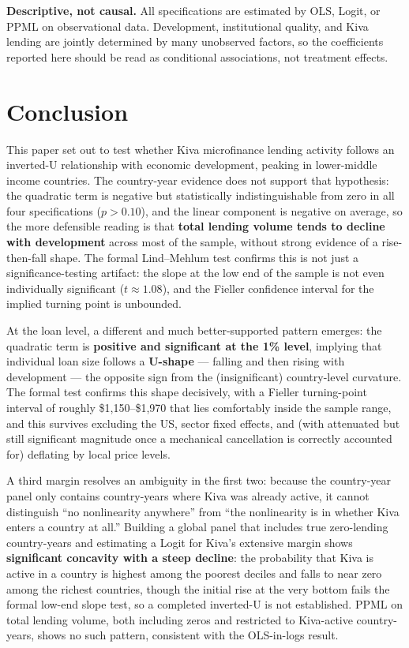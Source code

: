 \documentclass[12pt]{article}
\begin{document}
\textbf{Descriptive, not causal.} All specifications are estimated by OLS, Logit, or PPML on
observational data. Development, institutional quality, and Kiva lending are jointly determined by
many unobserved factors, so the coefficients reported here should be read as conditional associations,
not treatment effects.

\section{Conclusion}
\label{sec:conclusion}

This paper set out to test whether Kiva microfinance lending activity follows an inverted-U
relationship with economic development, peaking in lower-middle income countries. The country-year
evidence does not support that hypothesis: the quadratic term is negative but statistically
indistinguishable from zero in all four specifications ($p>0.10$), and the linear component is
negative on average, so the more defensible reading is that \textbf{total lending volume tends to
decline with development} across most of the sample, without strong evidence of a rise-then-fall
shape. The formal Lind--Mehlum test confirms this is not just a significance-testing artifact: the
slope at the low end of the sample is not even individually significant ($t\approx1.08$), and the
Fieller confidence interval for the implied turning point is unbounded.

At the loan level, a different and much better-supported pattern emerges: the quadratic term is
\textbf{positive and significant at the 1\% level}, implying that individual loan size follows a
\textbf{U-shape} --- falling and then rising with development --- the opposite sign from the
(insignificant) country-level curvature. The formal test confirms this shape decisively, with a Fieller
turning-point interval of roughly \$1,150--\$1,970 that lies comfortably inside the sample range, and
this survives excluding the US, sector fixed effects, and (with attenuated but still significant
magnitude once a mechanical cancellation is correctly accounted for) deflating by local price levels.

A third margin resolves an ambiguity in the first two: because the country-year panel only contains
country-years where Kiva was already active, it cannot distinguish ``no nonlinearity anywhere'' from
``the nonlinearity is in whether Kiva enters a country at all.'' Building a global panel that includes
true zero-lending country-years and estimating a Logit for Kiva's extensive margin shows
\textbf{significant concavity with a steep decline}: the probability that Kiva is active in a country
is highest among the poorest deciles and falls to near zero among the richest countries, though the
initial rise at the very bottom fails the formal low-end slope test, so a completed inverted-U is not
established. PPML on total lending volume, both including zeros and restricted to Kiva-active
country-years, shows no such pattern, consistent with the OLS-in-logs result.
\end{document}
